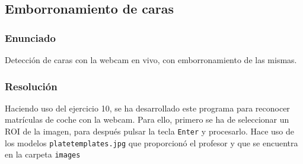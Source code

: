 \documentclass[a4paper,10pt,titlepage,oneside,openright]{book}
\begin{document}
\medskip
\subsection{Emborronamiento de caras}

\subsubsection*{Enunciado}
Detección de caras con la webcam en vivo, con emborronamiento de las mismas.

\subsubsection*{Resolución}
Haciendo uso del ejercicio 10, se ha desarrollado este programa para reconocer matrículas de coche con la webcam. Para ello, primero se ha de seleccionar un ROI de la imagen, para después pulsar la tecla \texttt{Enter} y procesarlo. Hace uso de los modelos \texttt{platetemplates.jpg} que proporcionó el profesor y que se encuentra en la carpeta \texttt{images}
\end{document}
